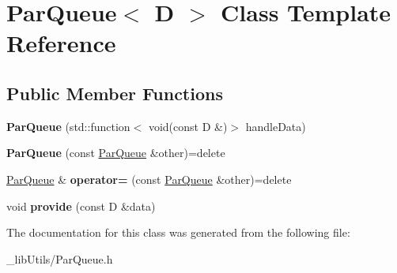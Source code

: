 \hypertarget{class_par_queue}{}\section{Par\+Queue$<$ D $>$ Class Template Reference}
\label{class_par_queue}
\subsection*{Public Member Functions}
\begin{DoxyCompactItemize}
\item 
\mbox{\label{class_par_queue_a73a919e4b58f1220a6f3a52af625b616}} 
{\bfseries Par\+Queue} (std\+::function$<$ void(const D \&)$>$ handle\+Data)
\item 
\mbox{\label{class_par_queue_a4ea9ecbf02398dbf4862f07bf33b8504}} 
{\bfseries Par\+Queue} (const \mbox{\hyperlink{class_par_queue}{Par\+Queue}} \&other)=delete
\item 
\mbox{\label{class_par_queue_aedef197ecfe9a5625d8501b25b262504}} 
\mbox{\hyperlink{class_par_queue}{Par\+Queue}} \& {\bfseries operator=} (const \mbox{\hyperlink{class_par_queue}{Par\+Queue}} \&other)=delete
\item 
\mbox{\label{class_par_queue_ae91d6ba584f537b85a8f1024d72128b5}} 
void {\bfseries provide} (const D \&data)
\end{DoxyCompactItemize}


The documentation for this class was generated from the following file\+:\begin{DoxyCompactItemize}
\item 
\+\_\+lib\+Utils/Par\+Queue.\+h\end{DoxyCompactItemize}

